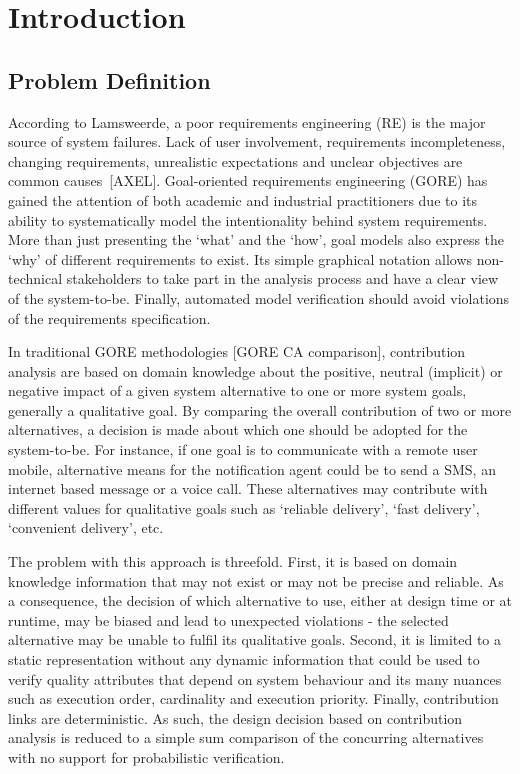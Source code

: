 \chapter{Introduction}\label{ch_introduction}%

\section{Problem Definition}

According to Lamsweerde, a poor requirements engineering (RE) is the major source of system failures. Lack of user involvement, requirements incompleteness, changing requirements, unrealistic expectations and unclear objectives are common causes~[AXEL]. Goal-oriented requirements engineering (GORE) has gained the attention of both academic and industrial practitioners due to its ability to systematically model the intentionality behind system requirements. More than just presenting the `what' and the `how', goal models also express the `why' of different requirements to exist. Its simple graphical notation allows non-technical stakeholders to take part in the analysis process and have a clear view of the system-to-be. Finally, automated model verification should avoid violations of the requirements specification.


In traditional GORE methodologies [GORE CA comparison], contribution  analysis are based on domain knowledge about the positive, neutral (implicit) or negative impact of a given system alternative to one or more system goals, generally a qualitative goal. By  comparing the overall contribution of two or more alternatives, a decision is made about which one should be adopted for the system-to-be. For instance, if one goal is to communicate with a remote user mobile, alternative means for the notification agent could be to send a SMS, an internet based message or a voice call. These alternatives may contribute with different values for qualitative goals such as `reliable delivery', `fast delivery', `convenient delivery', etc. 

The problem with this approach is threefold. First, it is based on domain knowledge information that may not exist or may not be precise and reliable. As a consequence, the decision of which alternative to use, either at design time or at runtime, may be biased and lead to unexpected violations - the selected alternative may be unable to fulfil its qualitative goals. Second, it is limited to a static representation without any dynamic information that could be used to verify quality attributes that depend on system behaviour and its many nuances such as execution order, cardinality and execution priority. Finally, contribution links are deterministic. As such, the design decision based on contribution analysis is reduced to a simple sum comparison of the concurring alternatives with no support for probabilistic verification.


